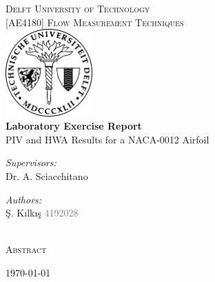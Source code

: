 \begin{titlepage}
\begin{center}

\textsc{\LARGE Delft University of Technology}\\[0.25cm]
\textsc{\normalsize [AE4180] Flow Measurement Techniques}\\[1.5cm]
\includegraphics[width=0.25\textwidth]{Title/delft_seal.eps}\\[1.5cm]
{\huge \bfseries Laboratory Exercise Report} \\
\huge  PIV and HWA Results for a NACA-0012 Airfoil \\[1.0cm]

\begin{minipage}[t]{0.4\textwidth}
\begin{flushleft} \large
\emph{Supervisors:}\\
    Dr. A. Sciacchitano\\
    

\end{flushleft}
\end{minipage}
\begin{minipage}[t]{0.4\textwidth}
\begin{flushright} \large
\emph{Authors:}\\
    \c{S}. K{\i}lk{\i}\c{s} \textcolor{gray}{4192028}\\
    
\end{flushright}
\end{minipage}\\[2.0cm]

\large \textsc{Abstract}

\begin{minipage}[t]{0.8\textwidth} \large



\end{minipage}

\vfill

\small{\today}


\end{center}
\end{titlepage}
\restoregeometry
